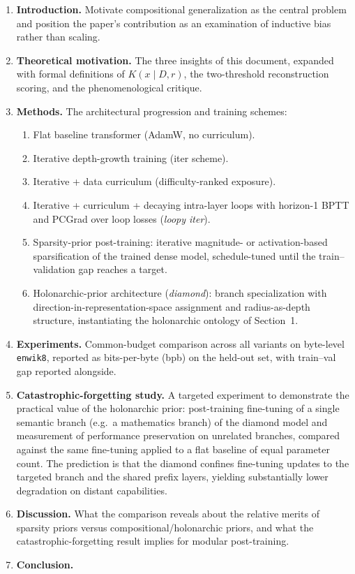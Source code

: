 \documentclass[11pt,a4paper]{article}
\begin{document}
\begin{enumerate}
  \item \textbf{Introduction.} Motivate compositional generalization as the central
        problem and position the paper's contribution as an examination of inductive
        bias rather than scaling.
  \item \textbf{Theoretical motivation.} The three insights of this document, expanded
        with formal definitions of $K(x \mid D, r)$, the two-threshold reconstruction
        scoring, and the phenomenological critique.
  \item \textbf{Methods.} The architectural progression and training schemes:
        \begin{enumerate}
          \item Flat baseline transformer (AdamW, no curriculum).
          \item Iterative depth-growth training (iter scheme).
          \item Iterative + data curriculum (difficulty-ranked exposure).
          \item Iterative + curriculum + decaying intra-layer loops with horizon-1
                BPTT and PCGrad over loop losses (\emph{loopy iter}).
          \item Sparsity-prior post-training: iterative magnitude- or activation-based
                sparsification of the trained dense model, schedule-tuned until the
                train--validation gap reaches a target.
          \item Holonarchic-prior architecture (\emph{diamond}): branch
                specialization with direction-in-representation-space assignment and
                radius-as-depth structure, instantiating the holonarchic ontology of
                Section~1.
        \end{enumerate}
  \item \textbf{Experiments.} Common-budget comparison across all variants on byte-level
        \texttt{enwik8}, reported as bits-per-byte (bpb) on the held-out set, with
        train--val gap reported alongside.
  \item \textbf{Catastrophic-forgetting study.} A targeted experiment to demonstrate
        the practical value of the holonarchic prior: post-training fine-tuning of a
        single semantic branch (e.g.\ a mathematics branch) of the diamond model and
        measurement of performance preservation on unrelated branches, compared
        against the same fine-tuning applied to a flat baseline of equal parameter
        count. The prediction is that the diamond confines fine-tuning updates to the
        targeted branch and the shared prefix layers, yielding substantially lower
        degradation on distant capabilities.
  \item \textbf{Discussion.} What the comparison reveals about the relative merits of
        sparsity priors versus compositional/holonarchic priors, and what the
        catastrophic-forgetting result implies for modular post-training.
  \item \textbf{Conclusion.}
\end{enumerate}
\end{document}
